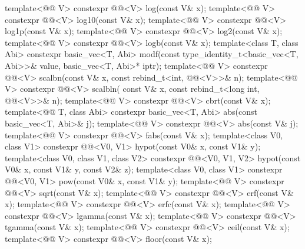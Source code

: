 \begin{codeblock}
{  template<@@ V> constexpr @@<V> log(const V& x);
  template<@@ V> constexpr @@<V> log10(const V& x);
  template<@@ V> constexpr @@<V> log1p(const V& x);
  template<@@ V> constexpr @@<V> log2(const V& x);
  template<@@ V> constexpr @@<V> logb(const V& x);
  template<class T, class Abi>
    constexpr basic_vec<T, Abi>
      modf(const type_identity_t<basic_vec<T, Abi>>& value, basic_vec<T, Abi>* iptr);
  template<@@ V>
    constexpr @@<V> scalbn(const V& x, const rebind_t<int, @@<V>>& n);
  template<@@ V>
    constexpr @@<V> scalbln(
      const V& x, const rebind_t<long int, @@<V>>& n);
  template<@@ V> constexpr @@<V> cbrt(const V& x);
  template<@@ T, class Abi>
    constexpr basic_vec<T, Abi> abs(const basic_vec<T, Abi>& j);
  template<@@ V> constexpr @@<V> abs(const V& j);
  template<@@ V> constexpr @@<V> fabs(const V& x);
  template<class V0, class V1>
    constexpr @@<V0, V1> hypot(const V0& x, const V1& y);
  template<class V0, class V1, class V2>
    constexpr @@<V0, V1, V2> hypot(const V0& x, const V1& y, const V2& z);
  template<class V0, class V1>
    constexpr @@<V0, V1> pow(const V0& x, const V1& y);
  template<@@ V> constexpr @@<V> sqrt(const V& x);
  template<@@ V> constexpr @@<V> erf(const V& x);
  template<@@ V> constexpr @@<V> erfc(const V& x);
  template<@@ V> constexpr @@<V> lgamma(const V& x);
  template<@@ V> constexpr @@<V> tgamma(const V& x);
  template<@@ V> constexpr @@<V> ceil(const V& x);
  template<@@ V> constexpr @@<V> floor(const V& x);
}
\end{codeblock}
